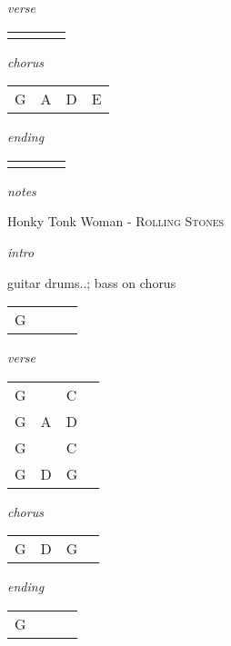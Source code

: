 \documentclass[12pt]{article}
\begin{document}
\textit{verse}

\begin{tabular}{|P{1.25in}|P{1.25in}|P{1.25in}|P{1.25in}|}
    &   &   &   \\
\end{tabular}

\textit{chorus}

\begin{tabular}{|P{1.25in}|P{1.25in}|P{1.25in}|P{1.25in}|}
  G  &  A &  D & E \\
\end{tabular}

\textit{ending}

\begin{tabular}{|P{1.25in}|P{1.25in}|P{1.25in}|P{1.25in}|}
    &   &   &   \\
\end{tabular}

\textit{notes}

\newpage

{\Huge Honky Tonk Woman} {\huge - \textsc{Rolling Stones}}

\huge
\textit{intro}

guitar drums..; bass on chorus

\begin{tabular}{|P{1.25in}|P{1.25in}|P{1.25in}|P{1.25in}|}
  G &   &   &   \\
\end{tabular}

\textit{verse}

\begin{tabular}{|P{1.25in}|P{1.25in}|P{1.25in}|P{1.25in}|}
  G &   & C  &   \\
  G & A  &  D &   \\
  G &   & C  &   \\
  G & D & G  &   \\
\end{tabular}

\textit{chorus}

\begin{tabular}{|P{1.25in}|P{1.25in}|P{1.25in}|P{1.25in}|}
  G &  D & G  &   \\
\end{tabular}

\textit{ending}

\begin{tabular}{|P{1.25in}|P{1.25in}|P{1.25in}|P{1.25in}|}
  G &   &   &   \\
\end{tabular}
\end{document}
